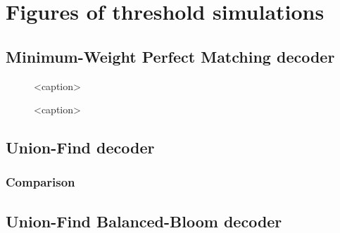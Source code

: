 \chapter{Figures of threshold simulations}\label{ap:figures}

\section{Minimum-Weight Perfect Matching decoder}\label{ap:figmwpm}


\begin{figure}[htb]
    \centering
    \begin{subfigure}[b]{\textwidth}
        
    \end{subfigure}
    \begin{subfigure}[b]{\textwidth}
        
    \end{subfigure}
    \caption{<caption>}
    \label{fig:thres_mwpm_2d}
\end{figure}
\begin{figure}[htb]
    \centering
    \begin{subfigure}[b]{\textwidth}
        
    \end{subfigure}
    \begin{subfigure}[b]{\textwidth}
        
    \end{subfigure}
    \caption{<caption>}
    \label{fig:thres_mwpm_3d}
\end{figure}


\section{Union-Find decoder}\label{ap:figuf}

\subsection{Comparison}\label{ap:figufcomp}

\section{Union-Find Balanced-Bloom decoder}\label{ap:figufbb}

